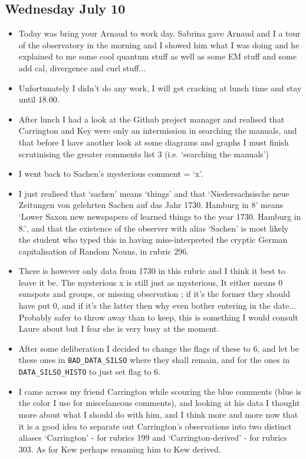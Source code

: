 \documentclass[12pt]{article}
\begin{document}
\subsection{Wednesday July 10}
\begin{itemize}
    \item Today was bring your Arnaud to work day. Sabrina gave Arnaud and I a tour of the observatory in the morning and I showed him what I was doing and he explained to me some cool quantum stuff as well as some EM stuff and some add cal, divergence and curl stuff... 
    \item Unfortunately I didn't do any work, I will get cracking at lunch time and stay until 18.00.
    \item After lunch I had a look at the Github project manager and realised that Carrington and Key were only an intermission in searching the manuals, and that before I have another look at some diagrams and graphs I must finish scrutinising the greater comments list 3 (i.e. `searching the manuals')
    \item I went back to Sachen's mysterious comment = `x'.
    \item I just realised that `sachen' means `things' and that `Niedersachsische neue Zeitungen von gelehrten Sachen auf das Jahr 1730. Hamburg in 8' means `Lower Saxon new newspapers of learned things to the year 1730. Hamburg in 8.', and that the existence of the observer with alias `Sachen' is most likely the student who typed this in having miss-interpreted the cryptic German capitalisation of Random Nouns, in rubric 296.
    \item There is however only data from 1730 in this rubric and I think it best to leave it be. The mysterious x is still just as mysterious, It either means 0 sunspots and groups, or missing observation ; if it's the former they should have put 0, and if it's the latter then why even bother entering in the date... Probably safer to throw away than to keep, this is something I would consult Laure about but I fear she is very busy at the moment.
    \item After some deliberation I decided to change the flags of these to 6, and let be these ones in \texttt{BAD\_DATA\_SILSO} where they shall remain, and for the ones in \texttt{DATA\_SILSO\_HISTO} to just set flag to 6.
    \item I came across my friend Carrington while scouring the blue comments (blue is the color I use for miscelaneous comments), and looking at his data I thought more about what I should do with him, and I think more and more now that it is a good idea to separate out Carrington's observations into two distinct aliases `Carrington' - for rubrics 199 and `Carrington-derived' - for rubrics 303. As for Kew perhaps renaming him to Kew derived.

\end{itemize}
\end{document}
